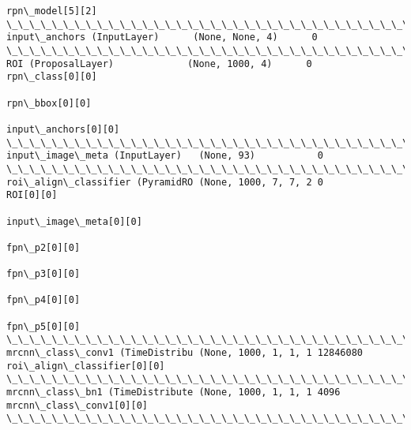\documentclass[11pt]{article}
\begin{document}
\begin{Verbatim}[commandchars=\\\{\}]
                                                                 rpn\_model[5][2]                  
\_\_\_\_\_\_\_\_\_\_\_\_\_\_\_\_\_\_\_\_\_\_\_\_\_\_\_\_\_\_\_\_\_\_\_\_\_\_\_\_\_\_\_\_\_\_\_\_\_\_\_\_\_\_\_\_\_\_\_\_\_\_\_\_\_\_\_\_\_\_\_\_\_\_\_\_\_\_\_\_\_\_\_\_\_\_\_\_\_\_\_\_\_\_\_\_\_\_
input\_anchors (InputLayer)      (None, None, 4)      0                                            
\_\_\_\_\_\_\_\_\_\_\_\_\_\_\_\_\_\_\_\_\_\_\_\_\_\_\_\_\_\_\_\_\_\_\_\_\_\_\_\_\_\_\_\_\_\_\_\_\_\_\_\_\_\_\_\_\_\_\_\_\_\_\_\_\_\_\_\_\_\_\_\_\_\_\_\_\_\_\_\_\_\_\_\_\_\_\_\_\_\_\_\_\_\_\_\_\_\_
ROI (ProposalLayer)             (None, 1000, 4)      0           rpn\_class[0][0]                  
                                                                 rpn\_bbox[0][0]                   
                                                                 input\_anchors[0][0]              
\_\_\_\_\_\_\_\_\_\_\_\_\_\_\_\_\_\_\_\_\_\_\_\_\_\_\_\_\_\_\_\_\_\_\_\_\_\_\_\_\_\_\_\_\_\_\_\_\_\_\_\_\_\_\_\_\_\_\_\_\_\_\_\_\_\_\_\_\_\_\_\_\_\_\_\_\_\_\_\_\_\_\_\_\_\_\_\_\_\_\_\_\_\_\_\_\_\_
input\_image\_meta (InputLayer)   (None, 93)           0                                            
\_\_\_\_\_\_\_\_\_\_\_\_\_\_\_\_\_\_\_\_\_\_\_\_\_\_\_\_\_\_\_\_\_\_\_\_\_\_\_\_\_\_\_\_\_\_\_\_\_\_\_\_\_\_\_\_\_\_\_\_\_\_\_\_\_\_\_\_\_\_\_\_\_\_\_\_\_\_\_\_\_\_\_\_\_\_\_\_\_\_\_\_\_\_\_\_\_\_
roi\_align\_classifier (PyramidRO (None, 1000, 7, 7, 2 0           ROI[0][0]                        
                                                                 input\_image\_meta[0][0]           
                                                                 fpn\_p2[0][0]                     
                                                                 fpn\_p3[0][0]                     
                                                                 fpn\_p4[0][0]                     
                                                                 fpn\_p5[0][0]                     
\_\_\_\_\_\_\_\_\_\_\_\_\_\_\_\_\_\_\_\_\_\_\_\_\_\_\_\_\_\_\_\_\_\_\_\_\_\_\_\_\_\_\_\_\_\_\_\_\_\_\_\_\_\_\_\_\_\_\_\_\_\_\_\_\_\_\_\_\_\_\_\_\_\_\_\_\_\_\_\_\_\_\_\_\_\_\_\_\_\_\_\_\_\_\_\_\_\_
mrcnn\_class\_conv1 (TimeDistribu (None, 1000, 1, 1, 1 12846080    roi\_align\_classifier[0][0]       
\_\_\_\_\_\_\_\_\_\_\_\_\_\_\_\_\_\_\_\_\_\_\_\_\_\_\_\_\_\_\_\_\_\_\_\_\_\_\_\_\_\_\_\_\_\_\_\_\_\_\_\_\_\_\_\_\_\_\_\_\_\_\_\_\_\_\_\_\_\_\_\_\_\_\_\_\_\_\_\_\_\_\_\_\_\_\_\_\_\_\_\_\_\_\_\_\_\_
mrcnn\_class\_bn1 (TimeDistribute (None, 1000, 1, 1, 1 4096        mrcnn\_class\_conv1[0][0]          
\_\_\_\_\_\_\_\_\_\_\_\_\_\_\_\_\_\_\_\_\_\_\_\_\_\_\_\_\_\_\_\_\_\_\_\_\_\_\_\_\_\_\_\_\_\_\_\_\_\_\_\_\_\_\_\_\_\_\_\_\_\_\_\_\_\_\_\_\_\_\_\_\_\_\_\_\_\_\_\_\_\_\_\_\_\_\_\_\_\_\_\_\_\_\_\_\_\_

\end{Verbatim}
\end{document}
